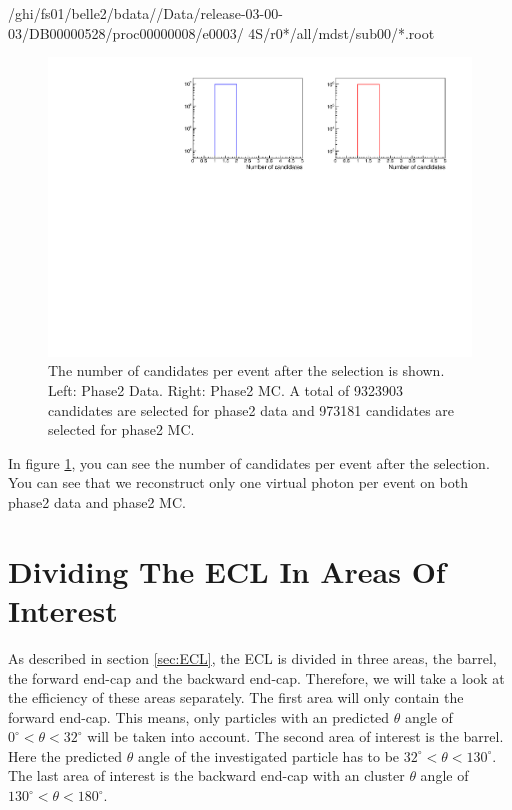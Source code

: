 \documentclass[a4paper,11pt,twosided,final,german,openbib,pdftex,listof=totoc,bibliography=totoc]{scrbook}
\begin{document}
/ghi/fs01/belle2/bdata//Data/release-03-00-03/DB00000528/proc00000008/e0003/ 4S/r0*/all/mdst/sub00/*.root
\newline




\begin{figure}[h!]
	\includegraphics[width=\textwidth]{Plots/master/CCand.pdf}
	\caption[Total Number Of Events After The Selection]{The number of candidates per event after the selection is shown. Left: Phase2 Data. Right: Phase2 MC. A total of 9323903 candidates are selected for phase2 data and 973181 candidates are selected for phase2 MC.}
	\label{fig:nCandAS}
\end{figure}






In figure \ref{fig:nCandAS}, you can see the number of candidates per event after the selection. You can see that we reconstruct only one virtual photon per event on both phase2 data and phase2 MC.






\section{Dividing The ECL In Areas Of Interest}
\label{sec:DivECL}

As described in section \ref{sec:ECL}, the ECL is divided in three areas, the barrel, the forward end-cap and the backward end-cap. Therefore, we will take a look at the efficiency of these areas separately. The first area will only contain the forward end-cap. This means, only particles with an predicted $\theta$ angle of $0^\circ <\theta<32^\circ$ will be taken into account. The second area of interest is the barrel. Here the predicted $\theta$ angle of the investigated particle has to be $32^\circ < \theta < 130^\circ$. The last area of interest is the backward end-cap with an cluster $\theta$ angle of $130^\circ <\theta < 180^\circ$.  
\end{document}
